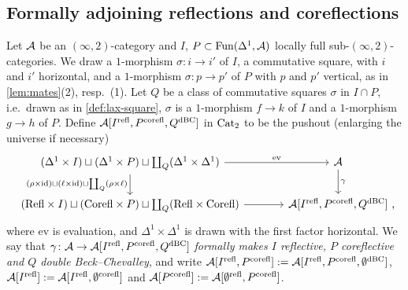 \subsection{Formally adjoining reflections and coreflections}
\label{subsec:2dloc-adjoining}

\begin{defi}
\label{def:adjoin}
%
Let $\mathcal{A}$ be an $(\infty,2)$-category and $I$,
$P \subset \operatorname{Fun}(\Delta^{1},\mathcal{A})$
locally full sub-$(\infty,2)$-categories. We draw a $1$-morphism
$\sigma\colon i \to i'$
of $I$, a commutative square, with $i$ and $i'$ horizontal, and a $1$-morphism
$\sigma\colon p \to p'$
of $P$ with $p$ and $p'$ vertical, as in \cref{lem:mates}(2), resp.\ (1).
Let $Q$ be a class of commutative squares $\sigma$ in $I \cap P$,
i.e.\ drawn as in \cref{def:lax-square}, $\sigma$ is a $1$-morphism $f \to k$
of $I$ and a $1$-morphism $g \to h$ of $P$.
Define $\mathcal{A}[{I}^{\mathrm{refl}},{P}^{\mathrm{corefl}},{Q}^{\mathrm{dBC}}]$ in $\mathrm{Cat}_{2}$ to be the pushout (enlarging the
universe if necessary)
\begin{equation*}
\begin{tikzcd}[column sep=large]
(\Delta^{1} \times I) \sqcup (\Delta^{1} \times P) \sqcup
\coprod_{Q}(\Delta^{1} \times \Delta^{1}) \ar[r, "\mathrm{ev}"] \ar[d,
"(\rho \times \mathrm{id}) \sqcup (\ell \times \mathrm{id}) \sqcup
\coprod_{Q}(\rho \times \ell)"'] & \A \ar[d, "\gamma"] \\
(\Refl \times I) \sqcup (\Corefl \times P) \sqcup
\coprod_{Q}(\Refl \times \Corefl) \ar[r] & \A\lrqrefl{I}{P}{Q} \rlap{\ ,}
\end{tikzcd}
\end{equation*}
where $\mathrm{ev}$ is evaluation, and
$\Delta^{1} \times \Delta^{1}$
is drawn with the first factor horizontal. We say that
$\gamma\colon \mathcal{A} \to \mathcal{A}[{I}^{\mathrm{refl}},{P}^{\mathrm{corefl}},{Q}^{\mathrm{dBC}}]$
\emph{formally makes $I$ reflective, $P$ coreflective and $Q$ double
Beck--Chevalley}, and write
$\mathcal{A}[{I}^{\mathrm{refl}},{P}^{\mathrm{corefl}}] := \mathcal{A}[{I}^{\mathrm{refl}},{P}^{\mathrm{corefl}},{\emptyset}^{\mathrm{dBC}}]$,
$\mathcal{A}[{I}^{\mathrm{refl}}] := \mathcal{A}[{I}^{\mathrm{refl}},{\emptyset}^{\mathrm{corefl}}]$
and
$\mathcal{A}[{P}^{\mathrm{corefl}}] := \mathcal{A}[{\emptyset}^{\mathrm{refl}},{P}^{\mathrm{corefl}}]$.
\end{defi}

